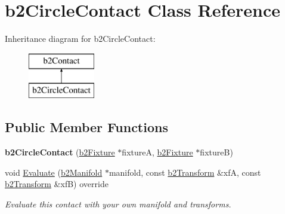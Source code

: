 \hypertarget{classb2_circle_contact}{}\section{b2\+Circle\+Contact Class Reference}
\label{classb2_circle_contact}
Inheritance diagram for b2\+Circle\+Contact\+:\begin{figure}[H]
\begin{center}
\leavevmode
\includegraphics[height=2.000000cm]{classb2_circle_contact}
\end{center}
\end{figure}
\subsection*{Public Member Functions}
\begin{DoxyCompactItemize}
\item 
\mbox{\label{classb2_circle_contact_a77e06c857edb2ca171340898f09ef789}} 
{\bfseries b2\+Circle\+Contact} (\hyperlink{classb2_fixture}{b2\+Fixture} $\ast$fixtureA, \hyperlink{classb2_fixture}{b2\+Fixture} $\ast$fixtureB)
\item 
\mbox{\label{classb2_circle_contact_a90036965fd66469e916a5afc6c244092}} 
void \hyperlink{classb2_circle_contact_a90036965fd66469e916a5afc6c244092}{Evaluate} (\hyperlink{structb2_manifold}{b2\+Manifold} $\ast$manifold, const \hyperlink{structb2_transform}{b2\+Transform} \&xfA, const \hyperlink{structb2_transform}{b2\+Transform} \&xfB) override
\begin{DoxyCompactList}\small\item\em Evaluate this contact with your own manifold and transforms. \end{DoxyCompactList}\end{DoxyCompactItemize}
